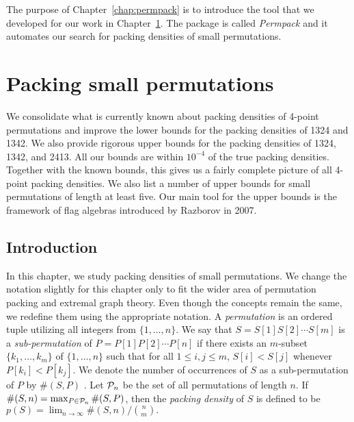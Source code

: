 \documentclass[12pt, a4paper, twoside]{report}
\begin{document}
The purpose of Chapter~\ref{chap:permpack} is to introduce the tool that we developed for our work in Chapter~\ref{chap:packsmall}. The package is called \emph{Permpack} and it automates our search for packing densities of small permutations. 
\chapter{Packing small permutations}
\label{chap:packsmall}
%

We consolidate what is currently known about packing densities of 4-point permutations and improve the lower bounds for the packing densities of 1324 and 1342. We also provide rigorous upper bounds for the packing densities of 1324, 1342, and 2413. All our bounds are within $10^{-4}$ of the true packing densities. Together with the known bounds, this gives us a fairly complete picture of all 4-point packing densities. We also list a number of upper bounds for small permutations of length at least five. Our main tool for the upper bounds is the framework of flag algebras introduced by Razborov in 2007.




\section{Introduction}
\label{sec:intro}

In this chapter, we study packing densities of small permutations. We change the notation slightly for this chapter only to fit the wider area of permutation packing and extremal graph theory. Even though the concepts remain the same, we redefine them using the appropriate notation. A \emph{permutation} is an ordered tuple utilizing all integers from $\{1,\ldots,n\}$. We say that $S = S[1]S[2]\cdots S[m] $ is a \emph{sub-permutation} of $P=P[1]P[2]\cdots P[n]$ if there exists an $m$-subset $\{k_1,\ldots,k_m\}$ of $\{1,\ldots,n\}$ such that for all $1 \leq i,j \leq m$, $S[i] < S[j]$ whenever $P[k_i] < P[k_j]$. We denote the number of occurrences of $S$ as a sub-permutation of $P$ by $\#(S,P)$ . Let $\P_n$ be the set of all permutations of length $n$. If $\#(S,n) = \max_{P \in \P_n}\#(S,P)$, then the \emph{packing density} of $S$ is defined to be $p(S) = \lim_{n\to\infty} \#(S,n)/\binom{n}{m}.$
\end{document}

